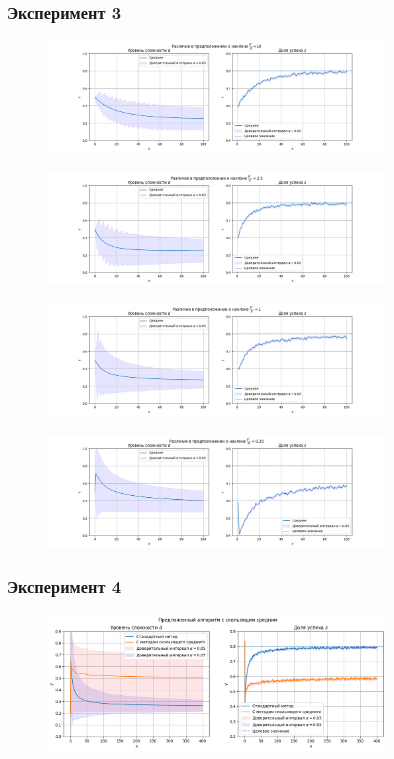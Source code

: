 \subsubsection{Эксперимент 3}
\begin{figure}[h!]
    \centering
    \includegraphics[width=0.8\textwidth]{assets/work/rating/3/0.png}
    \label{exp3:10}
\end{figure}
\begin{figure}[h!]
    \centering
    \includegraphics[width=0.8\textwidth]{assets/work/rating/3/1.png}
    \label{exp3:2_5}
\end{figure}
\begin{figure}[h!]
    \centering
    \includegraphics[width=0.8\textwidth]{assets/work/rating/3/2.png}
    \label{exp3:1}
\end{figure}
\begin{figure}[h!]
    \centering
    \includegraphics[width=0.8\textwidth]{assets/work/rating/3/3.png}
    \label{exp3:_0.25}
\end{figure}
\pagebreak
\subsubsection{Эксперимент 4}
\begin{figure}[h!]
    \centering
    \includegraphics[width=0.8\textwidth]{assets/work/rating/4/adaptive.png}
    \label{exp4:algo}
\end{figure}
